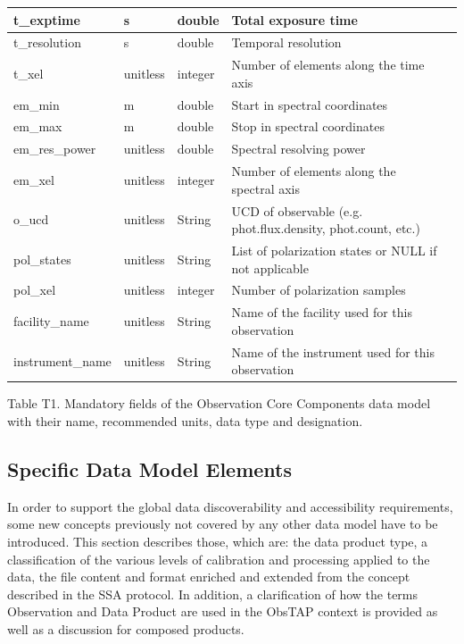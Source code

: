 \documentclass[11pt,a4paper]{ivoa}
\begin{document}
\begin{longtable}{|l|p{}|p{}|p{}|p{}|}
t\_exptime & s &  double & Total exposure time\\\hline
t\_resolution & s & double & Temporal resolution\\\hline
t\_xel & unitless & integer & Number of elements along the time axis\\\hline
em\_min & m & double & Start in spectral coordinates\\\hline
em\_max & m & double & Stop in spectral coordinates\\\hline
em\_res\_power & unitless & double & Spectral resolving power\\\hline
em\_xel & unitless & integer & Number of elements along the spectral axis\\\hline
o\_ucd & unitless & String & UCD of observable (e.g. phot.flux.density, phot.count, etc.)\\\hline
pol\_states & unitless & String & List of polarization states or NULL if not applicable\\\hline
pol\_xel & unitless & integer & Number of polarization samples \\\hline
facility\_name & unitless & String & Name of the facility used for this observation \\\hline
instrument\_name & unitless & String & Name of the instrument used for this observation \\\hline
\end{longtable}
\label{bkm:Ref460858868}Table T1.  Mandatory fields of the Observation Core Components data
model with their name, recommended units, data type and designation.

\subsection{Specific Data Model Elements}
In order to support the global data discoverability and accessibility requirements, some new concepts previously not
covered by any other data model have to be introduced.  This section describes those, which are: the data product type,
a classification of the various levels of calibration and processing applied to the data, the file content and format
enriched and extended from the concept described in the SSA protocol\citep{2012ivoa.spec.0210T}.  In addition, a
clarification of how the terms Observation and Data Product are used in the ObsTAP context is provided as well as a
discussion for composed products.
\end{document}
